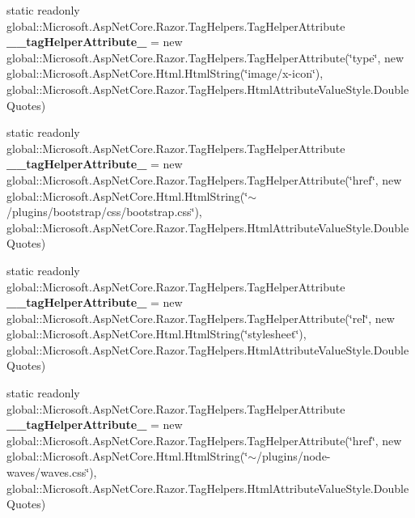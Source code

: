 \begin{DoxyCompactItemize}
\item 
\mbox{\label{class_asp_net_core_1_1_views___shared_____layout_aa02586ed693e72389db0450369e53bd9}} 
static readonly global\+::\+Microsoft.\+Asp\+Net\+Core.\+Razor.\+Tag\+Helpers.\+Tag\+Helper\+Attribute {\bfseries \+\_\+\+\_\+tag\+Helper\+Attribute\+\_} = new global\+::\+Microsoft.\+Asp\+Net\+Core.\+Razor.\+Tag\+Helpers.\+Tag\+Helper\+Attribute(\char`\"{}type\char`\"{}, new global\+::\+Microsoft.\+Asp\+Net\+Core.\+Html.\+Html\+String(\char`\"{}image/x-\/icon\char`\"{}), global\+::\+Microsoft.\+Asp\+Net\+Core.\+Razor.\+Tag\+Helpers.\+Html\+Attribute\+Value\+Style.\+Double\+Quotes)
\item 
\mbox{\label{class_asp_net_core_1_1_views___shared_____layout_a8753118f3df159774296edd0ac885777}} 
static readonly global\+::\+Microsoft.\+Asp\+Net\+Core.\+Razor.\+Tag\+Helpers.\+Tag\+Helper\+Attribute {\bfseries \+\_\+\+\_\+tag\+Helper\+Attribute\+\_} = new global\+::\+Microsoft.\+Asp\+Net\+Core.\+Razor.\+Tag\+Helpers.\+Tag\+Helper\+Attribute(\char`\"{}href\char`\"{}, new global\+::\+Microsoft.\+Asp\+Net\+Core.\+Html.\+Html\+String(\char`\"{}$\sim$/plugins/bootstrap/css/bootstrap.\+css\char`\"{}), global\+::\+Microsoft.\+Asp\+Net\+Core.\+Razor.\+Tag\+Helpers.\+Html\+Attribute\+Value\+Style.\+Double\+Quotes)
\item 
\mbox{\label{class_asp_net_core_1_1_views___shared_____layout_a0154a3d5e7860e37caa5f2009b22d4a0}} 
static readonly global\+::\+Microsoft.\+Asp\+Net\+Core.\+Razor.\+Tag\+Helpers.\+Tag\+Helper\+Attribute {\bfseries \+\_\+\+\_\+tag\+Helper\+Attribute\+\_} = new global\+::\+Microsoft.\+Asp\+Net\+Core.\+Razor.\+Tag\+Helpers.\+Tag\+Helper\+Attribute(\char`\"{}rel\char`\"{}, new global\+::\+Microsoft.\+Asp\+Net\+Core.\+Html.\+Html\+String(\char`\"{}stylesheet\char`\"{}), global\+::\+Microsoft.\+Asp\+Net\+Core.\+Razor.\+Tag\+Helpers.\+Html\+Attribute\+Value\+Style.\+Double\+Quotes)
\item 
\mbox{\label{class_asp_net_core_1_1_views___shared_____layout_a6c79c29b01bd25d5fdb0d3202f95b81c}} 
static readonly global\+::\+Microsoft.\+Asp\+Net\+Core.\+Razor.\+Tag\+Helpers.\+Tag\+Helper\+Attribute {\bfseries \+\_\+\+\_\+tag\+Helper\+Attribute\+\_} = new global\+::\+Microsoft.\+Asp\+Net\+Core.\+Razor.\+Tag\+Helpers.\+Tag\+Helper\+Attribute(\char`\"{}href\char`\"{}, new global\+::\+Microsoft.\+Asp\+Net\+Core.\+Html.\+Html\+String(\char`\"{}$\sim$/plugins/node-\/waves/waves.\+css\char`\"{}), global\+::\+Microsoft.\+Asp\+Net\+Core.\+Razor.\+Tag\+Helpers.\+Html\+Attribute\+Value\+Style.\+Double\+Quotes)

\end{DoxyCompactItemize}
